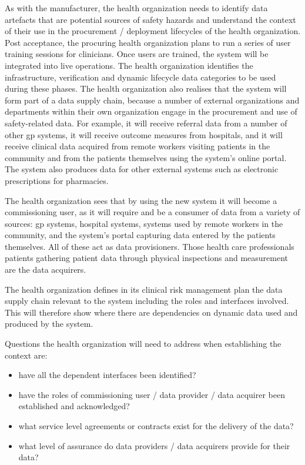 As with the manufacturer, the health organization needs to identify \glspl{data artefact} that are potential sources of safety hazards and understand the context of their use in the procurement / deployment lifecycles of the health organization.
Post acceptance, the procuring health organization plans to run a series of user training sessions for clinicians.
Once users are trained, the system will be integrated into live operations.
The health organization identifies the infrastructure,
\gls{verification} and dynamic lifecycle data categories to be used
during these phases.
The health organization also realises that the system will form part of a data supply chain, because a number of external organizations and departments within their own organization engage in the procurement and use of safety-related data.
For example, it will receive referral data from a number of other \gls{gp} systems, it will receive outcome measures from hospitals, and it will receive clinical data acquired from remote workers visiting patients in the community and from the patients themselves using the system's online portal.
The system also produces data for other external systems such as electronic prescriptions for pharmacies.

The health organization sees that by using the new system it will become a commissioning user, as it will require and be a consumer of data from a variety of sources: \gls{gp} systems, hospital systems, systems used by remote workers in the community, and the system's portal capturing data entered by the patients themselves. All of these act as data provisioners. Those health care professionals patients gathering patient data through physical inspections and measurement are the data acquirers.

The health organization defines in its clinical risk management plan the data supply chain relevant to the system including the roles and interfaces involved. This will therefore show where there are dependencies on dynamic data used and produced by the system.

Questions the health organization will need to address when establishing the context are:
\begin{itemize}
  \item have all the dependent interfaces been identified?
  \item have the roles of commissioning user / data provider / data acquirer been established and acknowledged?
  \item what service level agreements or contracts exist for the delivery of the data?
  \item what level of assurance do data providers / data acquirers provide for their data?
\end{itemize}

